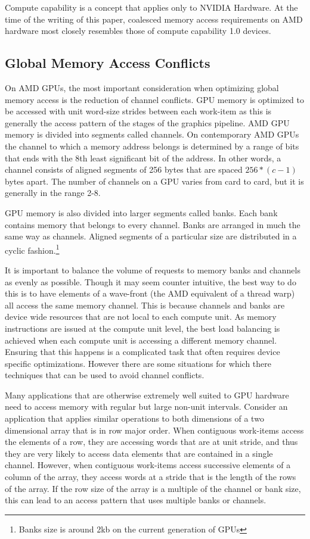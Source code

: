 \documentclass[12pt,twoside]{reedthesis}
\begin{document}
Compute capability is a concept that applies only to NVIDIA Hardware. At the time of the writing of this paper, coalesced memory access requirements on AMD hardware most closely resembles those of compute capability 1.0 devices.

\subsection{Global Memory Access Conflicts}

On AMD GPUs, the most important consideration when optimizing global memory access is the reduction of channel conflicts. GPU memory is optimized to be accessed with unit word-size strides between each work-item as this is generally the access pattern of the stages of the graphics pipeline. AMD GPU memory is divided into segments called channels. On contemporary AMD GPUs the channel to which a memory address belongs is determined by a range of bits that ends with the 8th least significant bit of the address.  In other words, a channel consists of aligned segments of 256 bytes that are spaced $256*(c-1)$ bytes apart. The number of channels on a GPU varies from card to card, but it is generally in the range 2-8.

GPU memory is also divided into larger segments called banks. Each bank contains memory that belongs to every channel. Banks are arranged in much the same way as channels. Aligned segments of a particular size are distributed in a cyclic fashion.\footnote{Banks size is around 2kb on the current generation of GPUs}

It is important to balance the volume of requests to memory banks and channels as evenly as possible. Though it may seem counter intuitive, the best way to do this is to have elements of a wave-front (the AMD equivalent of a thread warp) all access the same memory channel. This is because channels and banks are device wide resources that are not local to each compute unit. As memory instructions are issued at the compute unit level, the best load balancing is achieved when each compute unit is accessing a different memory channel. Ensuring that this happens is a complicated task that often requires device specific optimizations. However there are some situations for which there techniques that can be used to avoid channel conflicts.

Many applications that are otherwise extremely well suited to GPU hardware need to access memory with regular but large non-unit intervals. Consider an application that applies similar operations to both dimensions of a two dimensional array that is in row major order. When contiguous work-items access the elements of a row, they are accessing words that are at unit stride, and thus they are very likely to access data elements that are contained in a single channel. However, when contiguous work-items access successive elements of a column of the array, they access words at a stride that is the length of the rows of the array. If the row size of the array is a multiple of the channel or bank size, this can lead to an access pattern that uses multiple banks or channels.
\end{document}
